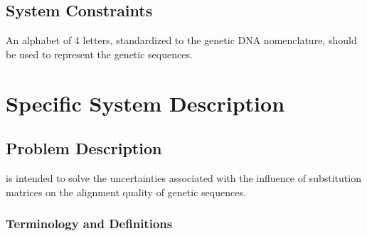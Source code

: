 \documentclass[12pt]{article}
\begin{document}
\subsection{System Constraints}

An alphabet of 4 letters, standardized to the genetic DNA nomenclature, should be used 
to represent the genetic sequences.


\section{Specific System Description}



\subsection{Problem Description} \label{Sec_pd}

\progname{} is intended to solve the uncertainties associated with the influence of 
substitution matrices on the alignment quality of genetic sequences.

\subsubsection{Terminology and  Definitions}


\end{document}
